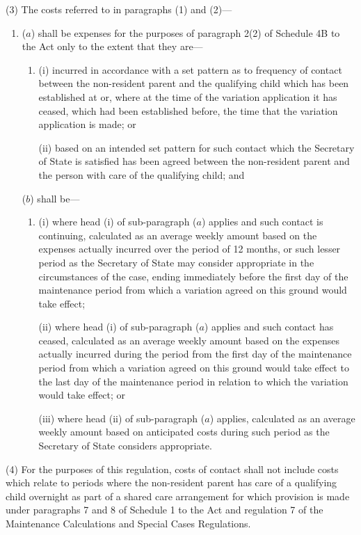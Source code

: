 \documentclass[12pt,a4paper]{article}
\begin{document}
(3) The costs referred to in paragraphs (1) and (2)—
\begin{enumerate}\item[]
($a$) shall be expenses for the purposes of paragraph 2(2) of Schedule 4B to the Act only to the extent that they are—
\begin{enumerate}\item[]
(i) incurred in accordance with a set pattern as to frequency of contact between the non-resident parent and the qualifying child which has been established at or, where at the time of the variation application it has ceased, which had been established before, the time that the variation application is made; or

(ii) based on an intended set pattern for such contact which the Secretary of State is satisfied has been agreed between the non-resident parent and the person with care of the qualifying child; and
\end{enumerate}

($b$) shall be—
\begin{enumerate}\item[]
(i) where head (i)  of sub-paragraph ($a$)  applies and such contact is continuing, calculated as an average weekly amount based on the expenses actually incurred over the period of 12 months, or such lesser period as the Secretary of State may consider appropriate in the circumstances of the case, ending immediately before the first day of the maintenance period from which a variation agreed on this ground would take effect;

(ii) where head (i)  of sub-paragraph ($a$)  applies and such contact has ceased, calculated as an average weekly amount based on the expenses actually incurred during the period from the first day of the maintenance period from which a variation agreed on this ground would take effect to the last day of the maintenance period in relation to which the variation would take effect; or

(iii) where head (ii)  of sub-paragraph ($a$)  applies, calculated as an average weekly amount based on anticipated costs during such period as the Secretary of State considers appropriate.
\end{enumerate}
\end{enumerate}

(4) For the purposes of this regulation, costs of contact shall not include costs which relate to periods where the non-resident parent has care of a qualifying child overnight as part of a shared care arrangement for which provision is made under paragraphs 7 and 8 of Schedule 1 to the Act and regulation 7 of the Maintenance Calculations and Special Cases Regulations.
\end{document}
